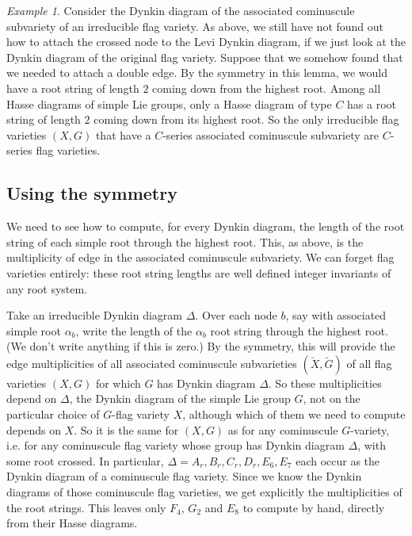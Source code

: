 \documentclass[a4paper,10pt]{amsart}
\theoremstyle{remark}
\newtheorem{example}{Example}
\renewcommand*{\aa}{\alpha}
\begin{document}
\begin{example}
Consider the Dynkin diagram of the associated cominuscule subvariety of an irreducible flag variety.
As above, we still have not found out how to attach the crossed node to the Levi Dynkin diagram, if we just look at the Dynkin diagram of the original flag variety.
Suppose that we somehow found that we needed to attach a double edge.
By the symmetry in this lemma, we would have a root string of length \(2\) coming down from the highest root.
Among all Hasse diagrams of simple Lie groups, only a Hasse diagram of type \(C\) has a root string of length \(2\) coming down from its highest root.
So the only irreducible flag varieties \((X,G)\) that have a \(C\)-series associated cominuscule subvariety are \(C\)-series flag varieties.
\end{example}
\subsection{Using the symmetry}
We need to see how to compute, for every Dynkin diagram, the length of the root string of each simple root through the highest root.
This, as above, is the multiplicity of edge in the associated cominuscule subvariety.
We can forget flag varieties entirely: these root string lengths are well defined integer invariants of any root system.

Take an irreducible Dynkin diagram \(\Delta\).
Over each node \(b\), say with associated simple root \(\aa_b\), write the length of the \(\aa_b\) root string through the highest root.
(We don't write anything if this is zero.)
By the symmetry, this will provide the edge multiplicities of all associated cominuscule subvarieties \((\breve X,\breve G)\) of all flag varieties \((X,G)\) for which \(G\) has Dynkin diagram \(\Delta\). 
So these multiplicities depend on \(\Delta\), the Dynkin diagram of the simple Lie group \(G\), not on the particular choice of \(G\)-flag variety \(X\), although which of them we need to compute depends on \(X\).
So it is the same for \((X,G)\) as for any cominuscule \(G\)-variety, i.e. for any cominuscule flag variety whose group has Dynkin diagram \(\Delta\), with some root crossed.
In particular, \(\Delta=A_r,B_r,C_r,D_r,E_6,E_7\) each occur as the Dynkin diagram of a cominuscule flag variety.
Since we know the Dynkin diagrams of those cominuscule flag varieties, we get explicitly the multiplicities of the root strings.
This leaves only \(F_4\), \(G_2\) and \(E_8\) to compute by hand, directly from their Hasse diagrams.
\end{document}
